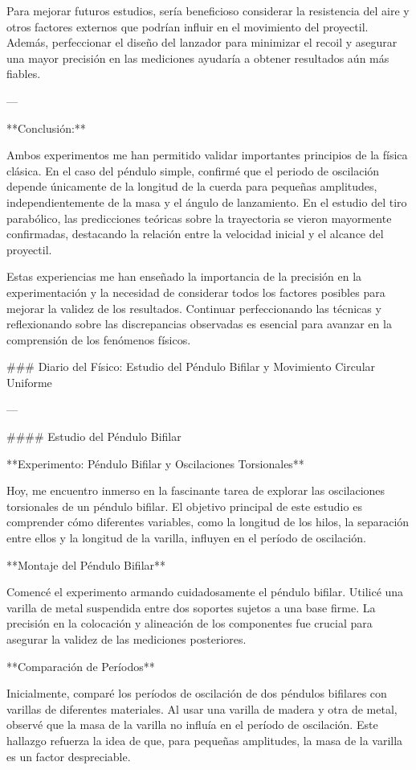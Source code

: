 \documentclass[journal]{IEEEtran}
\begin{document}
Para mejorar futuros estudios, sería beneficioso considerar la resistencia del aire y otros factores externos que podrían influir en el movimiento del proyectil. Además, perfeccionar el diseño del lanzador para minimizar el recoil y asegurar una mayor precisión en las mediciones ayudaría a obtener resultados aún más fiables.

---

**Conclusión:**

Ambos experimentos me han permitido validar importantes principios de la física clásica. En el caso del péndulo simple, confirmé que el periodo de oscilación depende únicamente de la longitud de la cuerda para pequeñas amplitudes, independientemente de la masa y el ángulo de lanzamiento. En el estudio del tiro parabólico, las predicciones teóricas sobre la trayectoria se vieron mayormente confirmadas, destacando la relación entre la velocidad inicial y el alcance del proyectil.

Estas experiencias me han enseñado la importancia de la precisión en la experimentación y la necesidad de considerar todos los factores posibles para mejorar la validez de los resultados. Continuar perfeccionando las técnicas y reflexionando sobre las discrepancias observadas es esencial para avanzar en la comprensión de los fenómenos físicos.

### Diario del Físico: Estudio del Péndulo Bifilar y Movimiento Circular Uniforme

---

#### Estudio del Péndulo Bifilar

**Experimento: Péndulo Bifilar y Oscilaciones Torsionales**

Hoy, me encuentro inmerso en la fascinante tarea de explorar las oscilaciones torsionales de un péndulo bifilar. El objetivo principal de este estudio es comprender cómo diferentes variables, como la longitud de los hilos, la separación entre ellos y la longitud de la varilla, influyen en el período de oscilación. 

**Montaje del Péndulo Bifilar**

Comencé el experimento armando cuidadosamente el péndulo bifilar. Utilicé una varilla de metal suspendida entre dos soportes sujetos a una base firme. La precisión en la colocación y alineación de los componentes fue crucial para asegurar la validez de las mediciones posteriores.

**Comparación de Períodos**

Inicialmente, comparé los períodos de oscilación de dos péndulos bifilares con varillas de diferentes materiales. Al usar una varilla de madera y otra de metal, observé que la masa de la varilla no influía en el período de oscilación. Este hallazgo refuerza la idea de que, para pequeñas amplitudes, la masa de la varilla es un factor despreciable.
\end{document}
